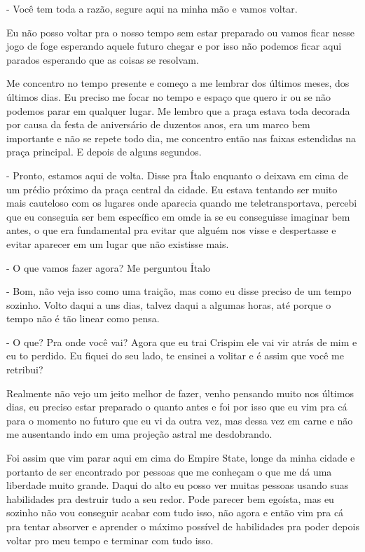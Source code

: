 - Você tem toda a razão, segure aqui na minha mão e vamos voltar.

Eu não posso voltar pra o nosso tempo sem estar preparado ou vamos ficar nesse jogo de foge esperando aquele futuro chegar e por isso não podemos ficar aqui parados esperando que as coisas se resolvam.

Me concentro no tempo presente e começo a me lembrar dos últimos meses, dos últimos dias. Eu preciso me focar no tempo e espaço que quero ir ou se não podemos parar em qualquer lugar. Me lembro que a praça estava toda decorada por causa da festa de aniversário de duzentos anos, era um marco bem importante e não se repete todo dia, me concentro então nas faixas estendidas na praça principal. E depois de alguns segundos.

- Pronto, estamos aqui de volta. Disse pra Ítalo enquanto o deixava em cima de um prédio próximo da praça central da cidade. Eu estava tentando ser muito mais cauteloso com os lugares onde aparecia quando me teletransportava, percebi que eu conseguia ser bem específico em omde ia se eu conseguisse imaginar bem antes, o que era fundamental pra evitar que alguém nos visse e despertasse e evitar aparecer em um lugar que não existisse mais.

- O que vamos fazer agora? Me perguntou Ítalo

- Bom, não veja isso como uma traição, mas como eu disse preciso de um tempo sozinho. Volto daqui a uns dias, talvez daqui a algumas horas, até porque o tempo não é tão linear como pensa.

- O que? Pra onde você vai? Agora que eu trai Crispim ele vai vir atrás de mim e eu to perdido. Eu fiquei do seu lado, te ensinei a volitar e é assim que você me retribui?

Realmente não vejo um jeito melhor de fazer, venho pensando muito nos últimos dias, eu preciso estar preparado o quanto antes e foi por isso que eu vim pra cá para o momento no futuro que eu vi da outra vez, mas dessa vez em carne e não me ausentando indo em uma projeção astral me desdobrando.

Foi assim que vim parar aqui em cima do Empire State, longe da minha cidade e portanto de ser encontrado por pessoas que me conheçam o que me dá uma liberdade muito grande. Daqui do alto eu posso ver muitas pessoas usando suas habilidades pra destruir tudo a seu redor. Pode parecer bem egoísta, mas eu sozinho não vou conseguir acabar com tudo isso, não agora e então vim pra cá pra tentar absorver e aprender o máximo possível de habilidades pra poder depois voltar pro meu tempo e terminar com tudo isso.

